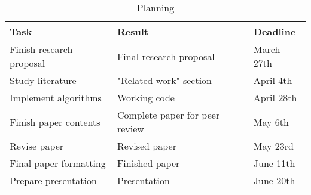\documentclass{acm_proc_article-sp}
\begin{document}
\begin{table*}
\begin{center}
\begin{tabular}{ | l | l | l | }
\hline
\textbf{Task} & \textbf{Result} & \textbf{Deadline} \\
\hline
Finish research proposal
    & Final research proposal
    & March 27th \\
Study literature
    & "Related work" section
    & April 4th \\
Implement algorithms
    & Working code
    & April 28th \\
Finish paper contents
    & Complete paper for peer review
    & May 6th \\
Revise paper
    & Revised paper
    & May 23rd \\
Final paper formatting
    & Finished paper
    & June 11th \\
Prepare presentation
    & Presentation
    & June 20th \\
\hline
\end{tabular}
\caption{Planning}
\label{tab-planning}
\end{center}
\end{table*}



\end{document}
